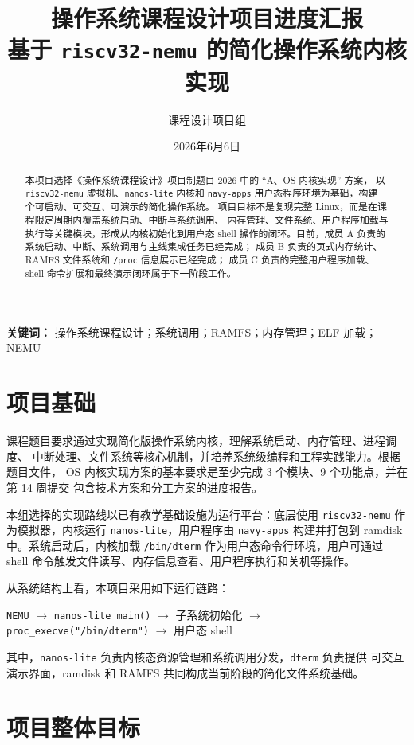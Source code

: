 \documentclass[UTF8,a4paper,zihao=-4]{ctexart}
\title{\textbf{操作系统课程设计项目进度汇报}\\
\large 基于 \texttt{riscv32-nemu} 的简化操作系统内核实现}
\author{课程设计项目组}
\date{2026年6月6日}
\begin{document}
\maketitle

\begin{abstract}
本项目选择《操作系统课程设计》项目制题目 2026 中的 ``A、OS 内核实现'' 方案，
以 \texttt{riscv32-nemu} 虚拟机、\texttt{nanos-lite} 内核和 \texttt{navy-apps}
用户态程序环境为基础，构建一个可启动、可交互、可演示的简化操作系统。
项目目标不是复现完整 Linux，而是在课程限定周期内覆盖系统启动、中断与系统调用、
内存管理、文件系统、用户程序加载与执行等关键模块，形成从内核初始化到用户态
shell 操作的闭环。目前，成员 A 负责的系统启动、中断、系统调用与主线集成任务已经完成；
成员 B 负责的页式内存统计、RAMFS 文件系统和 \texttt{/proc} 信息展示已经完成；
成员 C 负责的完整用户程序加载、shell 命令扩展和最终演示闭环属于下一阶段工作。
\end{abstract}

\noindent\textbf{关键词：} 操作系统课程设计；系统调用；RAMFS；内存管理；ELF 加载；NEMU

\section{项目基础}

课程题目要求通过实现简化版操作系统内核，理解系统启动、内存管理、进程调度、
中断处理、文件系统等核心机制，并培养系统级编程和工程实践能力。根据题目文件，
OS 内核实现方案的基本要求是至少完成 3 个模块、9 个功能点，并在第 14 周提交
包含技术方案和分工方案的进度报告。

本组选择的实现路线以已有教学基础设施为运行平台：底层使用 \texttt{riscv32-nemu}
作为模拟器，内核运行 \texttt{nanos-lite}，用户程序由 \texttt{navy-apps} 构建并打包到
ramdisk 中。系统启动后，内核加载 \texttt{/bin/dterm} 作为用户态命令行环境，用户可通过
shell 命令触发文件读写、内存信息查看、用户程序执行和关机等操作。

从系统结构上看，本项目采用如下运行链路：
\begin{center}
\texttt{NEMU} $\rightarrow$ \texttt{nanos-lite main()} $\rightarrow$ 子系统初始化
$\rightarrow$ \texttt{proc\_execve("/bin/dterm")} $\rightarrow$ 用户态 shell
\end{center}
其中，\texttt{nanos-lite} 负责内核态资源管理和系统调用分发，\texttt{dterm} 负责提供
可交互演示界面，ramdisk 和 RAMFS 共同构成当前阶段的简化文件系统基础。

\section{项目整体目标}
\end{document}
